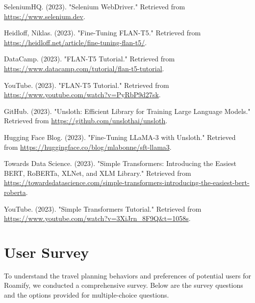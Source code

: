 \documentclass[conference]{IEEEtran}
\begin{document}
\begin{thebibliography}{1}
        SeleniumHQ. (2023). "Selenium WebDriver." Retrieved from \url{https://www.selenium.dev}.

        Heidloff, Niklas. (2023). "Fine-Tuning FLAN-T5." Retrieved from \url{https://heidloff.net/article/fine-tuning-flan-t5/}.

        DataCamp. (2023). "FLAN-T5 Tutorial." Retrieved from \url{https://www.datacamp.com/tutorial/flan-t5-tutorial}.

        YouTube. (2023). "FLAN-T5 Tutorial." Retrieved from \url{https://www.youtube.com/watch?v=PyRbP9d27sk}.

        GitHub. (2023). "Unsloth: Efficient Library for Training Large Language Models." Retrieved from \url{https://github.com/unslothai/unsloth}.

        Hugging Face Blog. (2023). "Fine-Tuning LLaMA-3 with Unsloth." Retrieved from \url{https://huggingface.co/blog/mlabonne/sft-llama3}.

        Towards Data Science. (2023). "Simple Transformers: Introducing the Easiest BERT, RoBERTa, XLNet, and XLM Library." Retrieved from \url{https://towardsdatascience.com/simple-transformers-introducing-the-easiest-bert-roberta}.

        YouTube. (2023). "Simple Transformers Tutorial." Retrieved from \url{https://www.youtube.com/watch?v=3XiJrn_8F9Q&t=1058s}.

\end{thebibliography}

\newpage

\appendix

\section{User Survey}
    To understand the travel planning behaviors and preferences of potential users for Roamify, we conducted a comprehensive survey. Below are the survey questions and the options provided for multiple-choice questions.
    \\
\end{document}
